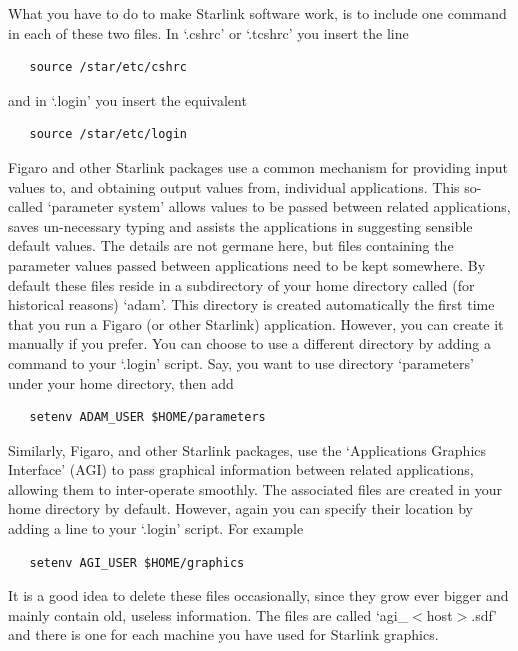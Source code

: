    What you have to do to make Starlink software work, is to include one
   command in each of these two files. In `.cshrc' or `.tcshrc'
   you insert the line

\begin{verbatim}
   source /star/etc/cshrc
\end{verbatim}

   and in `.login' you insert the equivalent

\begin{verbatim}
   source /star/etc/login
\end{verbatim}

   Figaro and other Starlink packages use a common mechanism for
   providing input values to, and obtaining output values from, individual
   applications.  This so-called `parameter system' allows values to be
   passed between related applications, saves un-necessary typing and
   assists the applications in suggesting sensible default values.  The
   details are not germane here, but files containing the parameter
   values passed between applications need to be kept somewhere.  By
   default these files reside in a subdirectory of your home directory
   called (for historical reasons) `adam'.  This directory is created
   automatically the first time that you run a Figaro (or other Starlink)
   application.  However, you can create it manually if you prefer.  You
   can choose to use a different directory by adding a command to your
   `.login' script.  Say, you want to use directory `parameters' under
   your home directory, then add

\begin{verbatim}
   setenv ADAM_USER $HOME/parameters
\end{verbatim}

   Similarly, Figaro, and other Starlink packages, use the `Applications
   Graphics Interface' (AGI) to pass graphical information between
   related applications, allowing them to inter-operate smoothly.  The
   associated files are created in your home directory by default.
   However, again you can specify their location by adding a line to your
   `.login' script.  For example

\begin{verbatim}
   setenv AGI_USER $HOME/graphics
\end{verbatim}

   It is a good idea to delete these files occasionally, since they grow
   ever bigger and mainly contain old, useless information. The files are
   called `agi\_$<$host$>$.sdf' and there is one for each machine you
   have used for Starlink graphics.

